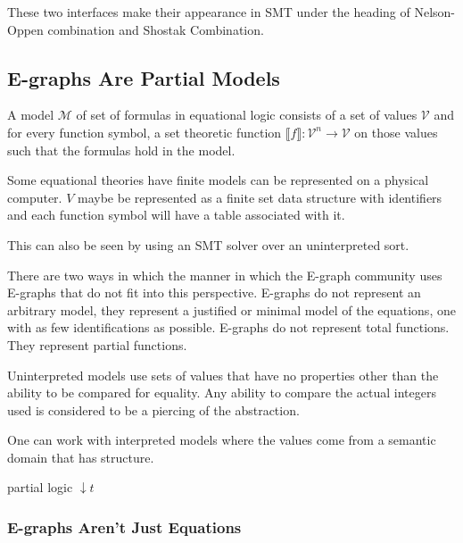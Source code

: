 These two interfaces make their appearance in SMT under the heading of Nelson-Oppen combination and Shostak Combination.












\subsection{E-graphs Are Partial Models}
A model $\mathcal{M}$ of set of formulas in equational logic consists of a set of values $\mathcal{V}$ and for every function symbol, a set theoretic function $\lBrack f \rBrack : \mathcal{V}^n \rightarrow \mathcal{V}$ on those values such that the formulas hold in the model.

Some equational theories have finite models can be represented on a physical computer. $V$ maybe be represented as a finite set data structure with identifiers and each function symbol will have a table associated with it.

This can also be seen by using an SMT solver over an uninterpreted sort.

There are two ways in which the manner in which the E-graph community uses E-graphs that do not fit into this perspective.
E-graphs do not represent an arbitrary model, they represent a justified or minimal model of the equations, one with as few identifications as possible.
E-graphs do not represent total functions. They represent partial functions. 

Uninterpreted models use sets of values that have no properties other than the ability to be compared for equality. Any ability to compare the actual integers used is considered to be a piercing of the abstraction.

One can work with interpreted models where the values come from a semantic domain that has structure.

partial logic $\downarrow t$

\subsubsection{E-graphs Aren't Just Equations}

